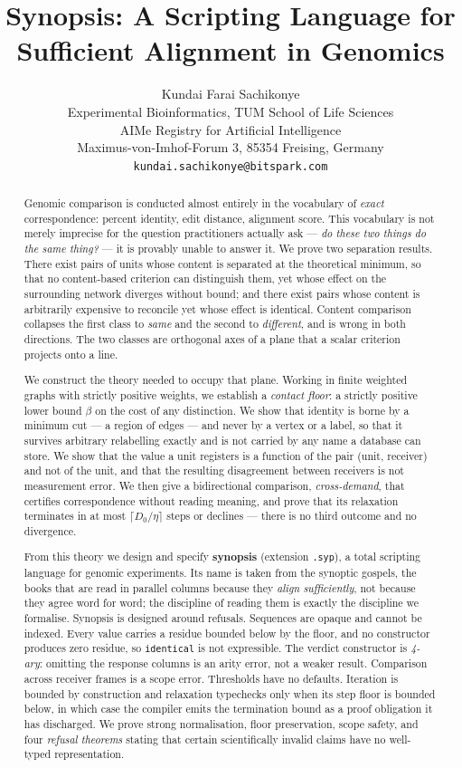 \documentclass[11pt,twocolumn,a4paper]{article}
\title{\bfseries Synopsis: A Scripting Language for \\[0.2em]
       Sufficient Alignment in Genomics}
\author{%
Kundai Farai Sachikonye\\[0.3em]
\normalsize Experimental Bioinformatics, TUM School of Life Sciences\\
\normalsize AIMe Registry for Artificial Intelligence \\
\normalsize Maximus-von-Imhof-Forum 3, 85354 Freising, Germany\\
\normalsize \texttt{kundai.sachikonye@bitspark.com}}
\theoremstyle{plain}
\theoremstyle{definition}
\theoremstyle{remark}
\newcommand{\flo}{\beta}                       %
\newcommand{\dem}{D}
\begin{document}
\maketitle

\begin{abstract}
\noindent
Genomic comparison is conducted almost entirely in the vocabulary of
\emph{exact} correspondence: percent identity, edit distance, alignment
score. This vocabulary is not merely imprecise for the question
practitioners actually ask --- \emph{do these two things do the same
thing?} --- it is provably unable to answer it. We prove two separation
results. There exist pairs of units whose content is separated at the
theoretical minimum, so that no content-based criterion can distinguish
them, yet whose effect on the surrounding network diverges without
bound; and there exist pairs whose content is arbitrarily expensive to
reconcile yet whose effect is identical. Content comparison collapses
the first class to \emph{same} and the second to \emph{different}, and
is wrong in both directions. The two classes are orthogonal axes of a
plane that a scalar criterion projects onto a line.

We construct the theory needed to occupy that plane. Working in finite
weighted graphs with strictly positive weights, we establish a
\emph{contact floor}: a strictly positive lower bound $\flo$ on the cost
of any distinction. We show that identity is borne by a minimum cut ---
a region of edges --- and never by a vertex or a label, so that it
survives arbitrary relabelling exactly and is not carried by any name a
database can store. We show that the value a unit registers is a
function of the pair (unit, receiver) and not of the unit, and that the
resulting disagreement between receivers is not measurement error. We
then give a bidirectional comparison, \emph{cross-demand}, that
certifies correspondence without reading meaning, and prove that its
relaxation terminates in at most $\lceil \dem_0/\eta\rceil$ steps or
declines --- there is no third outcome and no divergence.

From this theory we design and specify \textbf{synopsis} (extension
\texttt{.syp}), a total scripting language for genomic experiments. Its
name is taken from the synoptic gospels, the books that are read in
parallel columns because they \emph{align sufficiently}, not because they
agree word for word; the discipline of reading them is exactly the
discipline we formalise. Synopsis is designed around refusals. Sequences
are opaque and cannot be indexed. Every value carries a residue bounded
below by the floor, and no constructor produces zero residue, so
\texttt{identical} is not expressible. The verdict constructor is
\emph{4-ary}: omitting the response columns is an arity error, not a
weaker result. Comparison across receiver frames is a scope error.
Thresholds have no defaults. Iteration is bounded by construction and
relaxation typechecks only when its step floor is bounded below, in which
case the compiler emits the termination bound as a proof obligation it has
discharged. We prove strong normalisation, floor preservation, scope
safety, and four \emph{refusal theorems} stating that certain scientifically
invalid claims have no well-typed representation.


\end{abstract}
\end{document}
